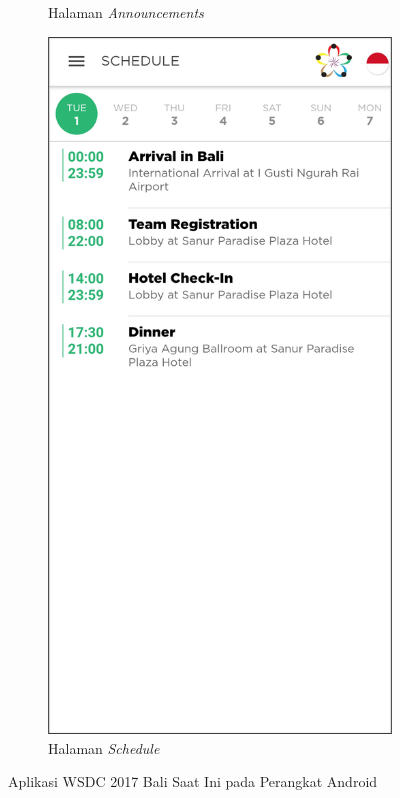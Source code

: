 \begin{figure}[H]
\begin{subfigure}[b]{0.3\textwidth}
	    \caption{Halaman {\it Announcements}}
	    \label{fig:wsdcAppAnnouncements}
     \end{subfigure}
     \hfill
     \begin{subfigure}[b]{0.3\textwidth}
         \centering
	    \includegraphics[scale=0.4]{Gambar/SchedulePage.png}
	    \caption{Halaman {\it Schedule}}
	    \label{fig:wsdcAppSchedule}
     \end{subfigure}
        \caption{Aplikasi WSDC 2017 Bali Saat Ini pada Perangkat Android}
        \label{fig:three graphs}
\end{figure}

